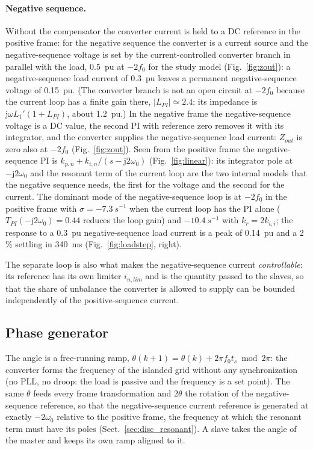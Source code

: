 \documentclass[10pt,a4paper]{scrartcl}
\newcommand{\ts}{t_s}
\newcommand{\wo}{\omega_0}
\newcommand{\kii}{k_{i,i}}
\newcommand{\kpn}{k_{p,n}}
\newcommand{\kin}{k_{i,n}}
\newcommand{\jj}{\mathrm{j}}
\begin{document}
\begin{onehalfspace}
\paragraph{Negative sequence.} Without the compensator the converter current is held to a DC reference in the positive frame: for the negative sequence the converter is a current source and the negative-sequence voltage is set by the current-controlled converter branch in parallel with the load, \SI{0.5}{pu} at $-2f_0$ for the study model (Fig.~\ref{fig:zout}): a negative-sequence load current of \SI{0.3}{pu} leaves a permanent negative-sequence voltage of \SI{0.15}{pu}. (The converter branch is not an open circuit at $-2f_0$ because the current loop has a finite gain there, $|L_{PI}| \simeq 2.4$: its impedance is $\jj\omega L_1'(1 + L_{PI})$, about \SI{1.2}{pu}.) In the negative frame the negative-sequence voltage is a DC value, the second PI with reference zero removes it with its integrator, and the converter supplies the negative-sequence load current: $Z_{out}$ is zero also at $-2f_0$ (Fig.~\ref{fig:zout}). Seen from the positive frame the negative-sequence PI is $\kpn + \kin/(s - \jj2\wo)$ (Fig.~\ref{fig:linear}): its integrator pole at $-\jj2\wo$ and the resonant term of the current loop are the two internal models that the negative sequence needs, the first for the voltage and the second for the current. The dominant mode of the negative-sequence loop is at $-2f_0$ in the positive frame with $\sigma = \SI{-7.3}{s^{-1}}$ when the current loop has the PI alone ($T_{PI}(-\jj2\wo) = 0.44$ reduces the loop gain) and $\SI{-10.4}{s^{-1}}$ with $k_r = 2\kii$; the response to a \SI{0.3}{pu} negative-sequence load current is a peak of \SI{0.14}{pu} and a 2\,\% settling in \SI{340}{ms} (Fig.~\ref{fig:loadstep}, right).

The separate loop is also what makes the negative-sequence current \emph{controllable}: its reference has its own limiter $i_{n,lim}$ and is the quantity passed to the slaves, so that the share of unbalance the converter is allowed to supply can be bounded independently of the positive-sequence current.

\subsection{Phase generator}

The angle is a free-running ramp, $\theta(k+1) = \theta(k) + 2\pi f_0\ts \bmod 2\pi$: the converter forms the frequency of the islanded grid without any synchronization (no PLL, no droop: the load is passive and the frequency is a set point). The same $\theta$ feeds every frame transformation and $2\theta$ the rotation of the negative-sequence reference, so that the negative-sequence current reference is generated at exactly $-2\wo$ relative to the positive frame, the frequency at which the resonant term must have its poles (Sect.~\ref{sec:disc_resonant}). A slave takes the angle of the master and keeps its own ramp aligned to it.


\end{onehalfspace}
\end{document}
